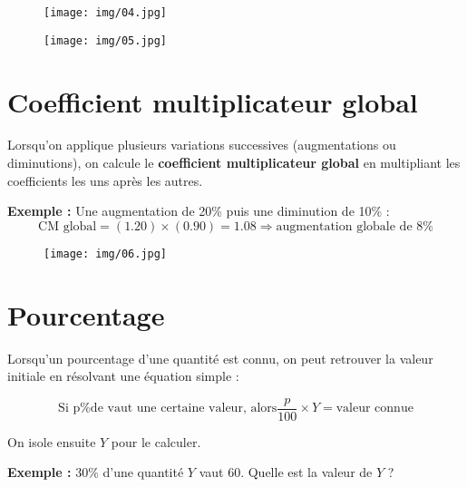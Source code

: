 \documentclass[a4paper,12pt]{article}
\begin{document}
    \begin{figure}[H]
        \centering
        \texttt{[image: img/04.jpg]}
      \end{figure}


    \begin{figure}[H]
        \centering
        \texttt{[image: img/05.jpg]}
      \end{figure}

\section*{Coefficient multiplicateur global}


\begin{tcolorbox}[colback=blue!5!white, colframe=blue!75!black, title=Méthode]
    Lorsqu'on applique plusieurs variations successives (augmentations ou diminutions), on calcule le \textbf{coefficient multiplicateur global} en multipliant les coefficients les uns après les autres.
    
    \medskip
    \textbf{Exemple :} Une augmentation de 20\% puis une diminution de 10\% :
    \[
    \text{CM global} = (1.20) \times (0.90) = 1.08 \Rightarrow \text{augmentation globale de } 8\%
    \]
\end{tcolorbox}

\begin{figure}[H]
    \centering
    \texttt{[image: img/06.jpg]}
  \end{figure}

  \section*{Pourcentage}

  \begin{tcolorbox}[colback=blue!5!white, colframe=blue!75!black, title=Méthode – Retrouver une valeur initiale à partir d'un pourcentage]
    Lorsqu'un pourcentage d'une quantité est connu, on peut retrouver la valeur initiale en résolvant une équation simple :
    
    \[
    \text{Si p\% de vaut une certaine valeur, alors} \frac{p}{100} \times Y = \text{valeur connue}
    \]
    
    On isole ensuite \(Y\) pour le calculer.
    \end{tcolorbox}
    
    \textbf{Exemple :} 30\% d'une quantité \(Y\) vaut 60. Quelle est la valeur de \(Y\) ?
    
\end{document}
